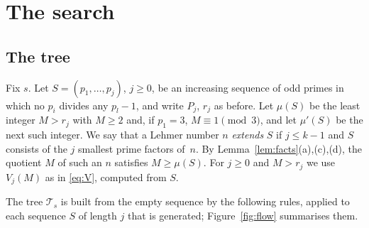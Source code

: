 \documentclass[11pt,reqno]{amsart}
\numberwithin{equation}{section}
\theoremstyle{plain}
\theoremstyle{definition}
\theoremstyle{remark}
\begin{document}
\section{The search}\label{sec:search}

\subsection{The tree}
Fix $s$. Let $S=(p_1,\dots,p_j)$, $j\ge0$, be an increasing sequence
of odd primes in which no $p_i$ divides any $p_l-1$, and write $P_j$,
$r_j$ as before. Let $\mu(S)$ be the least integer $M>r_j$ with $M\ge2$
and, if $p_1=3$, $M\equiv1\pmod3$, and let $\mu'(S)$ be the next such
integer. We say that a Lehmer number $n$ \emph{extends} $S$ if
$j\le k-1$ and $S$ consists of the $j$ smallest prime factors of~$n$.
By Lemma~\ref{lem:facts}(a),(c),(d), the quotient $M$ of such an $n$
satisfies $M\ge\mu(S)$. For $j\ge0$ and $M>r_j$ we use $V_j(M)$ as in
\eqref{eq:V}, computed from $S$.

The tree $\mathcal T_s$ is built from the empty sequence by the
following rules, applied to each sequence $S$ of length $j$ that is
generated; Figure~\ref{fig:flow} summarises them.
\end{document}
